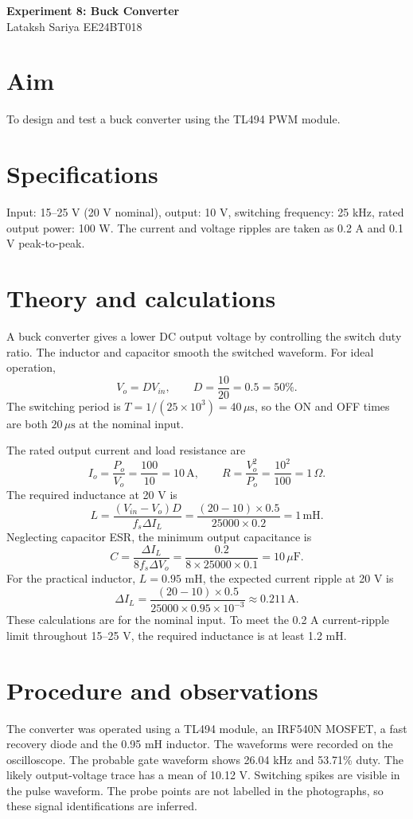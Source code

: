 \documentclass[11pt,a4paper]{article}
\begin{document}
\begin{center}
{\Large\bfseries Experiment 8: Buck Converter}\\[6pt]
Lataksh Sariya \quad EE24BT018
\end{center}
\section*{Aim}
To design and test a buck converter using the TL494 PWM module.
\section*{Specifications}
Input: 15--25 V (20 V nominal), output: 10 V, switching frequency: 25 kHz, rated output power: 100 W. The current and voltage ripples are taken as 0.2 A and 0.1 V peak-to-peak.
\section*{Theory and calculations}
A buck converter gives a lower DC output voltage by controlling the switch duty ratio. The inductor and capacitor smooth the switched waveform. For ideal operation,
\[
V_o=DV_{in},\qquad D=\frac{10}{20}=0.5=50\%.
\]
The switching period is $T=1/(25\times10^3)=40\,\mu\mathrm{s}$, so the ON and OFF times are both $20\,\mu\mathrm{s}$ at the nominal input.

The rated output current and load resistance are
\[
I_o=\frac{P_o}{V_o}=\frac{100}{10}=10\,\mathrm{A},
\qquad R=\frac{V_o^2}{P_o}=\frac{10^2}{100}=1\,\Omega.
\]
The required inductance at 20 V is
\[
L=\frac{(V_{in}-V_o)D}{f_s\Delta I_L}
=\frac{(20-10)\times0.5}{25000\times0.2}
=\boxed{1\,\mathrm{mH}}.
\]
Neglecting capacitor ESR, the minimum output capacitance is
\[
C=\frac{\Delta I_L}{8f_s\Delta V_o}
=\frac{0.2}{8\times25000\times0.1}
=\boxed{10\,\mu\mathrm{F}}.
\]
For the practical inductor, $L=0.95$ mH, the expected current ripple at 20 V is
\[
\Delta I_L=\frac{(20-10)\times0.5}{25000\times0.95\times10^{-3}}
\approx\boxed{0.211\,\mathrm{A}}.
\]
These calculations are for the nominal input. To meet the 0.2 A current-ripple limit throughout 15--25 V, the required inductance is at least 1.2 mH.
\section*{Procedure and observations}
The converter was operated using a TL494 module, an IRF540N MOSFET, a fast recovery diode and the 0.95 mH inductor. The waveforms were recorded on the oscilloscope. The probable gate waveform shows 26.04 kHz and 53.71\% duty. The likely output-voltage trace has a mean of 10.12 V. Switching spikes are visible in the pulse waveform. The probe points are not labelled in the photographs, so these signal identifications are inferred.
\end{document}
